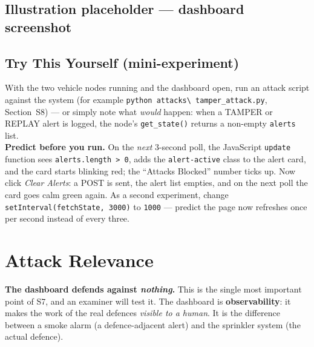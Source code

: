 \documentclass[11pt,a4paper]{report}
\begin{document}
\subsection{Illustration placeholder --- dashboard screenshot}
\begin{center}
\end{center}

\subsection{Try This Yourself (mini-experiment)}
With the two vehicle nodes running and the dashboard open, run an attack script
against the system (for example \texttt{python attacks\textbackslash
tamper\_attack.py}, Section~S8) --- or simply note what \emph{would} happen:
when a TAMPER or REPLAY alert is logged, the node's \texttt{get\_state()} returns
a non-empty \texttt{alerts} list.\\
\textbf{Predict before you run.} On the \emph{next} 3-second poll, the JavaScript
\texttt{update} function sees \texttt{alerts.length > 0}, adds the
\texttt{alert-active} class to the alert card, and the card starts blinking red;
the ``Attacks Blocked'' number ticks up. Now click \emph{Clear Alerts}: a POST is
sent, the alert list empties, and on the next poll the card goes calm green
again. As a second experiment, change \texttt{setInterval(fetchState, 3000)} to
\texttt{1000} --- predict the page now refreshes once per second instead of every
three.

\section{Attack Relevance}

\textbf{The dashboard defends against \emph{nothing}.} This is the single most
important point of S7, and an examiner will test it. The dashboard is
\textbf{observability}: it makes the work of the real defences \emph{visible to a
human}. It is the difference between a smoke alarm (a defence-adjacent alert) and
the sprinkler system (the actual defence).
\end{document}
